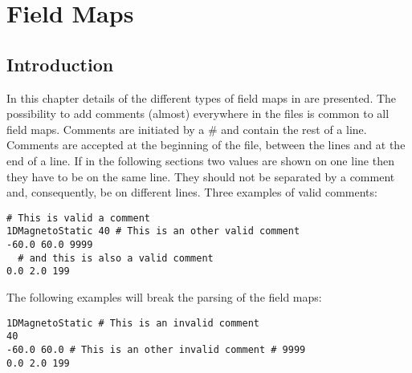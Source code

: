 \chapter{\opalt Field Maps}
\section{Introduction}
\label{chp:app_fieldmaps}
In this chapter details of the different types of field maps in \opalt are presented. The possibility to add comments (almost) everywhere in the files is common to all field maps. Comments are initiated by a \# and contain the rest of a line. Comments are accepted at the beginning of the file, between the lines and at the end of a line. If in the following sections two values are shown on one line then they have to be on the same line. They should not be separated by a comment and, consequently, be on different lines. Three examples of valid comments:
\begin{fmpage}
\begin{verbatim}
# This is valid a comment
1DMagnetoStatic 40 # This is an other valid comment
-60.0 60.0 9999
  # and this is also a valid comment
0.0 2.0 199
\end{verbatim}
\end{fmpage}

The following examples will break the parsing of the field maps:
\begin{fmpage}
\begin{verbatim}
1DMagnetoStatic # This is an invalid comment
40
-60.0 60.0 # This is an other invalid comment # 9999
0.0 2.0 199
\end{verbatim}
\end{fmpage}

